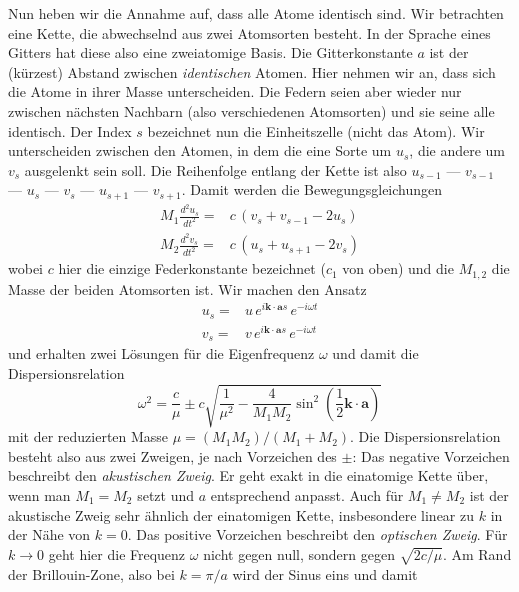 Nun heben wir die Annahme auf, dass alle Atome identisch sind. Wir betrachten eine Kette, die abwechselnd aus zwei Atomsorten besteht. In der Sprache eines Gitters hat diese also eine zweiatomige Basis. Die Gitterkonstante $a$ ist der (kürzest) Abstand zwischen \emph{identischen} Atomen. Hier nehmen wir an, dass sich die Atome in ihrer Masse unterscheiden. Die Federn seien aber wieder nur zwischen nächsten Nachbarn (also verschiedenen Atomsorten) und sie seine alle identisch. Der Index $s$ bezeichnet nun die Einheitszelle (nicht das Atom). Wir unterscheiden zwischen den Atomen, in dem die eine Sorte um $u_s$, die andere um $v_s$ ausgelenkt sein soll.  Die Reihenfolge entlang der Kette ist also $u_{s-1}$ ---  $v_{s-1}$ --- $u_{s}$ ---  $v_{s}$ --- $u_{s+1}$ ---  $v_{s+1}$. Damit werden die Bewegungsgleichungen
\begin{align}
 M_1 \frac{d^2 u_s}{dt^2} = & c \, \left( v_s + v_{s-1} - 2 u_s \right) \\
 M_2 \frac{d^2 v_s}{dt^2} = & c \, \left( u_s + u_{s+1} - 2 v_s \right) 
\end{align}
wobei $c$ hier die einzige Federkonstante bezeichnet ($c_1$ von oben) und die $M_{1,2}$ die Masse der beiden Atomsorten ist.
Wir machen den Ansatz
\begin{align}
  u_s   = & u \,   e^{i \mathbf{k} \cdot \mathbf{a}  s} \, e^{-i \omega t} \\
  v_s  = & v  \, e^{i \mathbf{k} \cdot \mathbf{a}  s} \, e^{-i \omega t}
\end{align}
und erhalten zwei Lösungen für die Eigenfrequenz $\omega$ und damit die Dispersionsrelation
\begin{equation}
\omega^2 =  \frac{c}{\mu}
\pm c \sqrt{ \frac{1}{\mu^2} - \frac{4}{M_1 M_2}  \sin^2 \left( \frac{1}{2}  \mathbf{k} \cdot \mathbf{a} \right) }  \label{eq:phonon_2atom}
\end{equation}
mit der reduzierten Masse $\mu = (M_1  M_2)/(M_1 + M_2)$. Die Dispersionsrelation besteht also aus zwei Zweigen, je nach Vorzeichen des $\pm$: Das negative Vorzeichen beschreibt den \emph{akustischen Zweig}. Er geht exakt in die einatomige Kette über, wenn man $M_1 = M_2$ setzt und $a$ entsprechend anpasst. Auch für $M_1 \neq M_2$ ist der akustische Zweig sehr ähnlich der einatomigen Kette, insbesondere linear zu $k$ in der Nähe von $k=0$. Das positive Vorzeichen beschreibt den \emph{optischen Zweig}. Für $k \rightarrow 0$ geht hier die Frequenz $\omega$ nicht gegen null, sondern gegen $\sqrt{2 c / \mu}$. Am Rand der Brillouin-Zone, also bei $k = \pi /a $ wird der Sinus eins und damit
